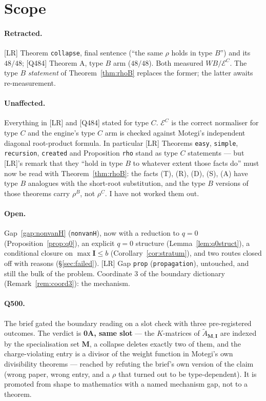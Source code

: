\documentclass[11pt]{article}
\theoremstyle{plain}
\theoremstyle{definition}
\theoremstyle{remark}
\theoremstyle{plain}
\newcommand{\bI}{\mathbf{I}}
\newcommand{\bM}{\mathbf{M}}
\newcommand{\At}{\widetilde{A}}
\begin{document}
\section{Scope}
\label{sec:scope}

\paragraph{Retracted.}
[LR] Theorem \texttt{collapse}, final sentence (``the same $\rho$ holds in type
$B$'') and its $48/48$; [Q484] Theorem A, type $B$ arm ($48/48$).  Both measured
$WB/\mathcal{E}^C$.  The type $B$ \emph{statement} of
Theorem~\ref{thm:rhoB} replaces the former; the latter awaits re-measurement.

\paragraph{Unaffected.}
Everything in [LR] and [Q484] stated for type $C$.  $\mathcal{E}^C$ is the
correct normaliser for type $C$ and the engine's type $C$ arm is checked against
Motegi's independent diagonal root-product formula.  In particular
[LR] Theorems \texttt{easy}, \texttt{simple}, \texttt{recursion},
\texttt{created} and Proposition \texttt{rho} stand as type $C$ statements ---
but [LR]'s remark that they ``hold in type $B$ to whatever extent those facts
do'' must now be read with Theorem~\ref{thm:rhoB}: the facts (T), (R), (D), (S),
(A) have type $B$ analogues with the short-root substitution, and the type $B$
versions of those theorems carry $\rho^B$, not $\rho^C$.  I have not worked them
out.

\paragraph{Open.}
Gap~\ref{gap:nonvanH} (\texttt{nonvanH}), now with a reduction to $q=0$
(Proposition~\ref{prop:q0}), an explicit $q=0$ structure
(Lemma~\ref{lem:q0struct}), a conditional closure on $\max\bI\le b$
(Corollary~\ref{cor:stratum}), and two routes closed off with reasons
(\S\ref{sec:failed}).  [LR] Gap \texttt{prop} (\texttt{propagation}), untouched,
and still the bulk of the problem.  Coordinate 3 of the boundary dictionary
(Remark~\ref{rem:coord3}): the mechanism.

\paragraph{Q500.}
The brief gated the boundary reading on a slot check with three pre-registered
outcomes.  The verdict is \textbf{0A, same slot} --- the $K$-matrices of
$\At_{\bM,\bI}$ are indexed by the specialisation set $\bM$, a collapse deletes
exactly two of them, and the charge-violating entry is a divisor of the weight
function in Motegi's own divisibility theorems --- reached by refuting the
brief's own version of the claim (wrong paper, wrong entry, and a $\rho$ that
turned out to be type-dependent).  It is promoted from shape to mathematics with
a named mechanism gap, not to a theorem.
\end{document}
